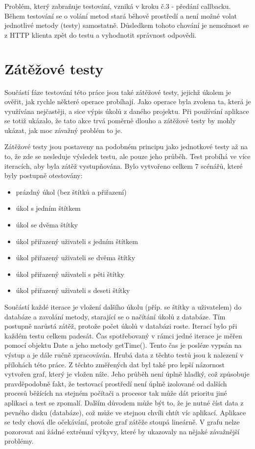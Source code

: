 Problém, který zabraňuje testování, vzniká v kroku č.3 - předání callbacku. Během testování se o volání metod stará běhové prostředí a není možné volat jednotlivé metody (testy) samostatně. Důsledkem tohoto chování je nemožnost  se z HTTP klienta zpět do testu a vyhodnotit správnost odpovědi.

\section{Zátěžové testy}

Součástí fáze testování této práce jsou také zátěžové testy, jejichž úkolem je ověřit, jak rychle některé operace probíhají. Jako operace byla zvolena ta, která je využívána nejčastěji, a sice výpis úkolů z daného projektu. Při používání aplikace se totiž ukázalo, že tato akce trvá poměrně dlouho a zátěžové testy by mohly ukázat, jak moc závažný problém to je.

Zátěžové testy jsou postaveny na podobném principu jako jednotkové testy až na to, že zde se nesleduje výsledek testu, ale pouze jeho průběh. Test probíhá ve více iteracích, aby byla zátěž vystupňována. Bylo vytvořeno celkem 7 scénářů, které byly postupně otestovány:

\begin{itemize}
\item prázdný úkol (bez štítků a přiřazení)
\item úkol s jedním štítkem
\item úkol se dvěma štítky
\item úkol přiřazený uživateli s jedním štítkem
\item úkol přiřazený uživateli se dvěma štítky
\item úkol přiřazený uživateli s pěti štítky
\item úkol přiřazený uživateli s deseti štítky
\end{itemize}

Součástí každé iterace je vložení dalšího úkolu (příp. se štítky a uživatelem) do databáze a zavolání metody, starající se o načítání úkolů z databáze. Tím postupně narůstá zátěž, protože počet úkolů v databázi roste. Iterací bylo při každém testu celkem padesát. Čas spotřebovaný v rámci jedné iterace je měřen pomocí objektu Date a jeho metody getTime(). Tento čas je posléze vypsán na výstup a je dále ručně zpracováván. Hrubá data z těchto testů jsou k nalezení v přílohách této práce. Z těchto změřených dat byl také pro lepší názornost vytvořen graf, který je vložen níže. Jeho průběh není úplně hladký, což způsobuje pravděpodobně fakt, že testovací prostředí není úplně izolované od dalších procesů běžících na stejném počítači a procesor tak může dát prioritu jiné aplikaci a test se zpomalí. Dalším důvodem může být to, že je nutné číst data z pevného disku (databáze), což může ve stejnou chvíli chtít víc aplikací. Aplikace se tedy chová dle očekávání, protože graf zátěže stoupá lineárně. V grafu nelze pozorovat ani žádné extrémní výkyvy, které by ukazovaly na nějaké závažnější problémy.

